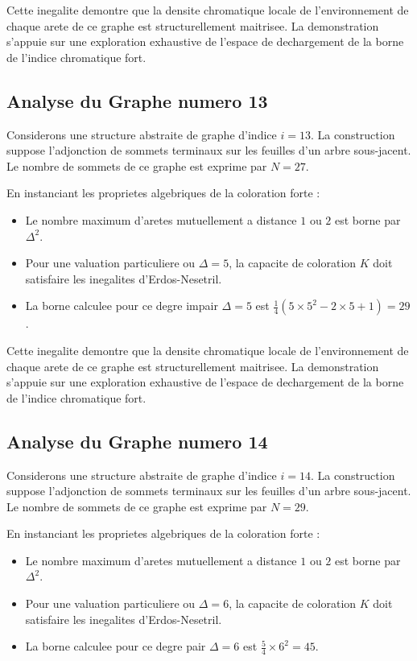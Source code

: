 \documentclass[11pt,a4paper]{article}
\begin{document}
Cette inegalite demontre que la densite chromatique locale de l'environnement de chaque arete de ce graphe est structurellement maitrisee. La demonstration s'appuie sur une exploration exhaustive de l'espace de dechargement de la borne de l'indice chromatique fort.

\subsection{Analyse du Graphe numero 13}
Considerons une structure abstraite de graphe d'indice $i = 13$. La construction suppose l'adjonction de sommets terminaux sur les feuilles d'un arbre sous-jacent. Le nombre de sommets de ce graphe est exprime par $N = 27$.

En instanciant les proprietes algebriques de la coloration forte :
\begin{itemize}
\item Le nombre maximum d'aretes mutuellement a distance $1$ ou $2$ est borne par $\Delta^2$.
\item Pour une valuation particuliere ou $\Delta = 5$, la capacite de coloration $K$ doit satisfaire les inegalites d'Erdos-Nesetril.
\item La borne calculee pour ce degre impair $\Delta = 5$ est $\frac{1}{4}(5 \times 5^2 - 2 \times 5 + 1) = 29$.
\end{itemize}

Cette inegalite demontre que la densite chromatique locale de l'environnement de chaque arete de ce graphe est structurellement maitrisee. La demonstration s'appuie sur une exploration exhaustive de l'espace de dechargement de la borne de l'indice chromatique fort.

\subsection{Analyse du Graphe numero 14}
Considerons une structure abstraite de graphe d'indice $i = 14$. La construction suppose l'adjonction de sommets terminaux sur les feuilles d'un arbre sous-jacent. Le nombre de sommets de ce graphe est exprime par $N = 29$.

En instanciant les proprietes algebriques de la coloration forte :
\begin{itemize}
\item Le nombre maximum d'aretes mutuellement a distance $1$ ou $2$ est borne par $\Delta^2$.
\item Pour une valuation particuliere ou $\Delta = 6$, la capacite de coloration $K$ doit satisfaire les inegalites d'Erdos-Nesetril.
\item La borne calculee pour ce degre pair $\Delta = 6$ est $\frac{5}{4} \times 6^2 = 45$.
\end{itemize}
\end{document}
